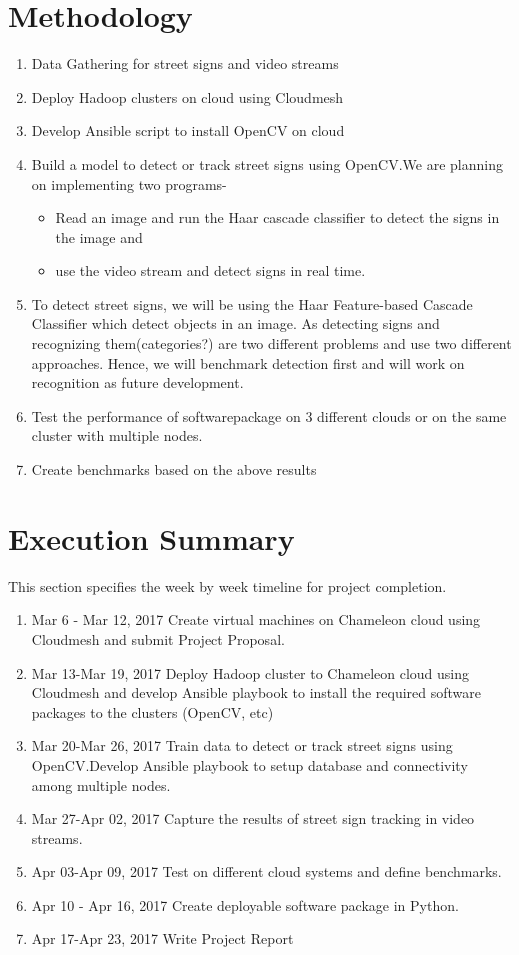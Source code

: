 \documentclass[9pt,twocolumn,twoside]{styles/osajnl}
\begin{document}
\section{Methodology}
\begin{enumerate}
\item Data Gathering for street signs and video streams
\item Deploy Hadoop clusters on cloud using Cloudmesh
\item Develop Ansible script to install OpenCV on cloud
\item Build a model to detect or track street signs using OpenCV.We are planning on implementing two programs-
    \begin{itemize}
    \item Read an image and run the Haar cascade classifier to detect the signs in the image and 
    \item use the video stream and detect signs in real time.
    \end{itemize}
\item To detect street signs, we will be using the Haar Feature-based Cascade Classifier which detect objects in an image. As detecting signs and recognizing them(categories?) are two different problems and use two different approaches. Hence, we will benchmark detection first and will work on recognition as future development.
\item Test the performance of softwarepackage on 3 different clouds or on the same cluster with multiple nodes.
\item Create benchmarks based on the above results

\end{enumerate}


\section{Execution Summary}
This section specifies the week by week timeline for project completion.
\begin{enumerate}
\item {Mar 6 - Mar 12, 2017}
 Create virtual machines on Chameleon cloud using Cloudmesh and submit Project Proposal.
\item {Mar 13-Mar 19, 2017}
 Deploy Hadoop cluster to Chameleon cloud using Cloudmesh and develop Ansible playbook to install the required software packages to the clusters (OpenCV, etc)
\item {Mar 20-Mar 26, 2017}
Train data to detect or track street signs using OpenCV.Develop Ansible playbook to setup database and connectivity among multiple nodes.
\item {Mar 27-Apr 02, 2017}
Capture the results of street sign tracking in video streams.
\item {Apr 03-Apr 09, 2017}
Test on different cloud systems and define benchmarks.
\item {Apr 10 - Apr 16, 2017}
Create deployable software package in Python.
\item {Apr 17-Apr 23, 2017}
Write Project Report  
\end{enumerate}
\end{document}
